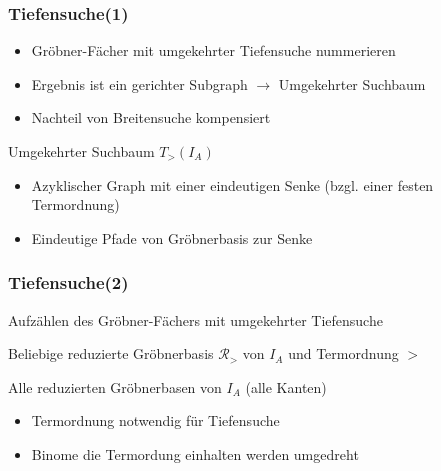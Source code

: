 \documentclass{beamer}
\newcommand{\Input}{\item[\algorithmicinput]}
\newcommand{\algorithmicinput}{\textbf{Input:}}
\newcommand{\Output}{\item[\algorithmicoutput]}
\newcommand{\algorithmicoutput}{\textbf{Output:}}
\begin{document}

\begin{frame}[<+->][fragile]
\frametitle{Tiefensuche(1)}

\begin{itemize}
\item Gröbner-Fächer mit umgekehrter Tiefensuche nummerieren
\item Ergebnis ist ein gerichter Subgraph $\longrightarrow$ Umgekehrter Suchbaum 
\item Nachteil von Breitensuche kompensiert

\end{itemize}

\begin{block}{Umgekehrter Suchbaum $T_{>}(I_{A})$}
\begin{itemize}
\item Azyklischer Graph mit einer eindeutigen Senke (bzgl. einer festen Termordnung)
\item Eindeutige Pfade von Gröbnerbasis zur Senke
\end{itemize}

\end{block}
 
\end{frame}



\begin{frame}[fragile]
\frametitle{Tiefensuche(2)}


\begin{algorithm}[H]
\caption{Aufzählen des Gröbner-Fächers mit umgekehrter Tiefensuche}

\begin{algorithmic}[1]

\Input
Beliebige reduzierte Gröbnerbasis  $ \mathcal{R}_{>} $ von $I_A$ und Termordnung $>$

\Output
Alle reduzierten Gröbnerbasen von $I_A$ (alle Kanten) 


\end{algorithmic}
\end{algorithm}

\begin{itemize}
\item Termordnung notwendig für Tiefensuche
\item Binome die Termordung einhalten werden \glqq umgedreht\grqq
\end{itemize}

 
\end{frame}
\end{document}
